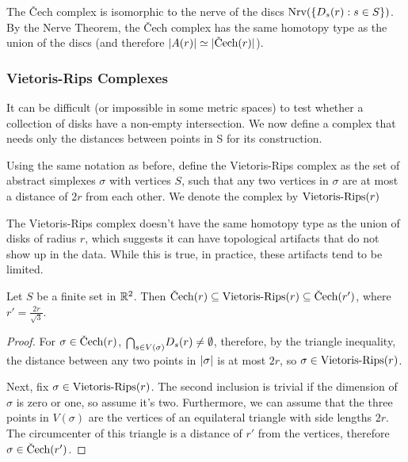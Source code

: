 The \v{C}ech complex is isomorphic to the nerve of the discs $\textrm{Nrv}(\{D_s(r): s \in S\})$. By the Nerve Theorem, the \v{C}ech complex has the same homotopy type as the union of the discs (and therefore $\abs{A(r)} \simeq \abs{\cech(r)}$).

\subsubsection{Vietoris-Rips Complexes}

It can be difficult (or impossible in some metric spaces) to test whether a collection of disks have a non-empty intersection. We now define a complex that needs only the distances between points in S for its construction.

\begin{definition}
Using the same notation as before, define the Vietoris-Rips complex as the set of abstract simplexes $\sigma$ with vertices $S$, such that any two vertices in $\sigma$ are at most a distance of $2r$ from each other. We denote the complex by $\textrm{Vietoris-Rips}(r)$
\end{definition}

The Vietoris-Rips complex doesn't have the same homotopy type as the union of disks of radius $r$, which suggests it can have topological artifacts that do not show up in the data. While this is true, in practice, these artifacts tend to be limited.

\begin{proposition}
Let $S$ be a finite set in $\mathbb{R}^2$. Then $\cech(r) \subseteq \rips(r) \subseteq \cech(r')$, where $r' = \frac {2r}{\sqrt{3}}$.
\end{proposition}

\begin{proof}
For $\sigma \in \cech(r)$, $\mathsmaller{\bigcap}_{s \in V(\sigma)} D_s(r) \not = \emptyset$, therefore, by the triangle inequality, the distance between any two points in $\lvert\sigma\rvert$ is at most $2r$, so $\sigma \in \textrm{Vietoris-Rips}(r)$.

Next, fix $\sigma \in \textrm{Vietoris-Rips}(r)$. The second inclusion is trivial if the dimension of $\sigma$ is zero or one, so assume it's two. Furthermore, we can assume that the three points in $V(\sigma)$ are the vertices of an equilateral triangle with side lengths $2r$. The circumcenter of this triangle is a distance of $r'$ from the vertices, therefore $\sigma \in \cech(r')$.
\end{proof}

